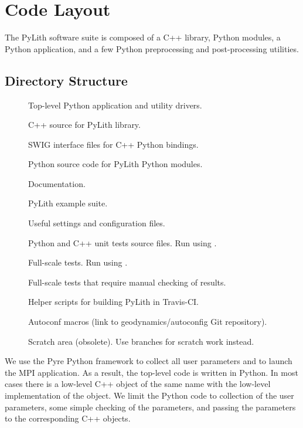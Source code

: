 \section{Code Layout}
\label{sec:code:layout}

The PyLith software suite is composed of a C++ library, Python
modules, a Python application, and a few Python preprocessing and
post-processing utilities.

\subsection{Directory Structure}

\begin{description}
\item[] Top-level Python application and
  utility drivers.
\item[] C++ source for PyLith library.
\item[] SWIG interface files for C++ Python
  bindings.
\item[] Python source code for PyLith Python modules.
\item[] Documentation.
\item[] PyLith example suite.
\item[] Useful settings and configuration files.
\item[] Python and C++ unit tests source
  files. Run using .
\item[] Full-scale tests. Run using
  .
\item[] Full-scale tests that require manual checking
  of results.
\item[] Helper scripts for building PyLith in
  Travis-CI.
\item[] Autoconf macros (link to
  geodynamics/autoconfig Git repository).
\item[] Scratch area (obsolete). Use branches for
  scratch work instead.
\end{description}

We use the Pyre Python framework to collect all user parameters and to
launch the MPI application. As a result, the top-level code is written
in Python. In most cases there is a low-level C++ object of the same
name with the low-level implementation of the object. We limit the
Python code to collection of the user parameters, some simple
checking of the parameters, and passing the parameters to the
corresponding C++ objects.

